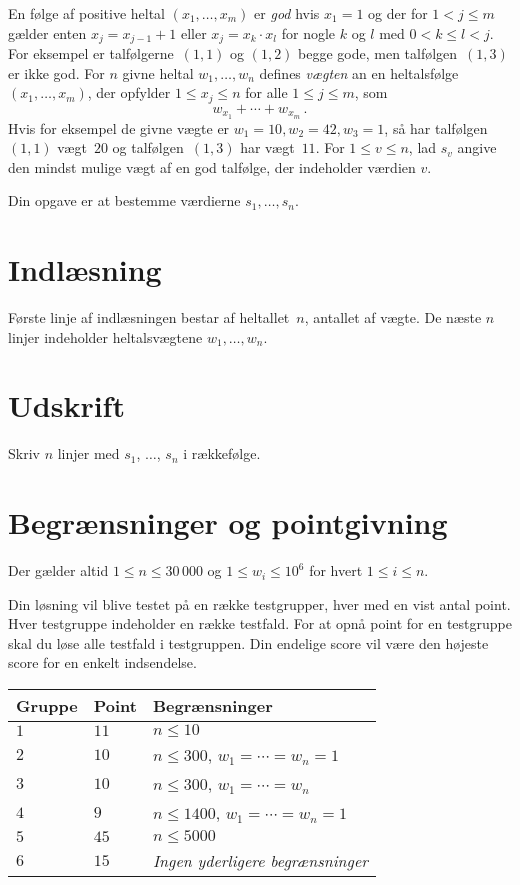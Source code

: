 
\noindent
En følge af positive heltal $(x_1,\ldots,x_m)$ er \emph{god} hvis  $x_1 = 1$ og der for $1 < j \leq m$ gælder enten $x_j=x_{j-1}+1$ eller $x_j=x_k\cdot x_l$ for nogle $k$ og $l$ med $0< k\leq l< j$.
For eksempel er talfølgerne~$(1,1)$ og $(1,2)$ begge gode, men talfølgen~$(1,3)$ er ikke god.
For  $n$ givne heltal $w_1,\ldots,w_n$ defines
\emph{vægten} an en heltalsfølge $(x_1,\ldots,x_m)$, der opfylder $1\leq x_j \leq n$ for alle $1\leq j\leq m$, som
\[ w_{x_1} +\cdots +w_{x_m}\,.\] 
Hvis for eksempel de givne vægte er $w_1=10,  w_2=42 ,w_3 = 1$, så har talfølgen~$(1,1)$ vægt~$20$ og talfølgen~$(1,3)$ har vægt~$11$.
For $1\leq v\leq n$, lad $s_v$ angive den mindst mulige vægt af en god talfølge, der indeholder værdien $v$.

Din opgave er at bestemme værdierne $s_1,\ldots ,s_n$.

\section*{Indlæsning}

Første linje af indlæsningen bestar af heltallet~$n$, antallet af vægte.
De næste $n$ linjer indeholder heltalsvægtene $w_1, \ldots, w_n$.

\section*{Udskrift}

Skriv $n$ linjer med $s_1$, $\ldots$, $s_n$ i rækkefølge.

\section*{Begrænsninger og pointgivning}

Der gælder altid
$1\leq n \leq 30\,000$ %
og
$1\leq w_i \leq 10^6$ for hvert $1\leq i \leq n$.%


Din løsning vil blive testet på en række testgrupper, hver med en vist antal point.
Hver testgruppe indeholder en række testfald.
For at opnå point for en testgruppe skal du løse alle testfald i testgruppen.
Din endelige score vil være den højeste score for en enkelt indsendelse.

\medskip
\begin{tabular}{lll}
Gruppe & Point & Begrænsninger \\\hline
$1$   & $11$ & $n\leq 10$ \\
$2$   & $10$ & $n\leq 300$, $w_1=\cdots=w_n = 1$ \\
$3$   & $10$ & $n\leq 300$, $w_1=\cdots=w_n$ \\ %
$4$   & $9$ & $n\leq 1400$, $w_1=\cdots=w_n = 1$ \\
$5$   & $45$ & $n\leq 5000$\\
$6$   & $15$ & \emph{Ingen yderligere begrænsninger}
\end{tabular}

